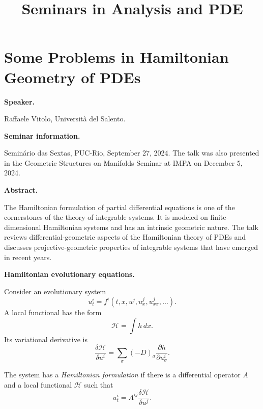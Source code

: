 



\title{Seminars in Analysis and PDE}

\maketitle


\label{section-phantom}

\tableofcontents

\section{Some Problems in Hamiltonian
Geometry of PDEs}
\label{section-hamiltonian-geometry-pdes}

\medskip\noindent
{\bf Speaker.}

Raffaele Vitolo,
Universit\`a del Salento.

\medskip\noindent
{\bf Seminar information.}

Semin\'ario das Sextas, PUC-Rio,
September 27, 2024. The talk was also
presented in the Geometric Structures on
Manifolds Seminar at IMPA on
December 5, 2024.

\medskip\noindent
{\bf Abstract.}

The Hamiltonian formulation of partial
differential equations is one of the
cornerstones of the theory of integrable
systems. It is modeled on finite-dimensional
Hamiltonian systems and has an intrinsic
geometric nature. The talk reviews
differential-geometric aspects of the
Hamiltonian theory of PDEs and discusses
projective-geometric properties of
integrable systems that have emerged in
recent years.

\medskip\noindent
{\bf Hamiltonian evolutionary equations.}

Consider an evolutionary system
$$
u_t^i=f^i(t,x,u^j,u_x^j,u_{xx}^j,\ldots).
$$
A local functional has the form
$$
\mathcal{H}=\int h\,dx.
$$
Its variational derivative is
$$
\frac{\delta\mathcal{H}}{\delta u^i}
=
\sum_\sigma(-D)_\sigma
\frac{\partial h}{\partial u^i_\sigma}.
$$

\begin{definition}
\label{definition-hamiltonian-pde}
The system has a \textit{Hamiltonian
formulation} if there is a differential
operator $A$ and a local functional
$\mathcal{H}$ such that
$$
u_t^i=A^{ij}
\frac{\delta\mathcal{H}}{\delta u^j}.
$$
\end{definition}

